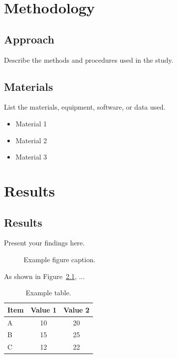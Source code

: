 \documentclass[12pt,a4paper]{report}
\begin{document}
\chapter{Methodology}

\section{Approach}

Describe the methods and procedures used in the study.

\section{Materials}

List the materials, equipment, software, or data used.

\begin{itemize}
    \item Material 1
    \item Material 2
    \item Material 3
\end{itemize}

\chapter{Results}

\section{Results}

Present your findings here.

\begin{figure}[H]
    \centering
    \caption{Example figure caption.}
    \label{fig:example}
\end{figure}

As shown in Figure~\ref{fig:example}, ...

\begin{table}[H]
    \centering
    \caption{Example table.}
    \label{tab:example}
    \begin{tabular}{lcc}
        \toprule
        Item & Value 1 & Value 2 \\
        \midrule
        A & 10 & 20 \\
        B & 15 & 25 \\
        C & 12 & 22 \\
        \bottomrule
    \end{tabular}
\end{table}
\end{document}
